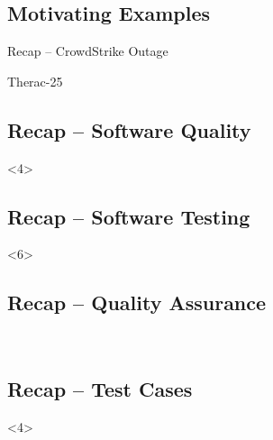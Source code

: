 \subsection{Motivating Examples}
\begin{frame}{Recap -- CrowdStrike Outage}
	\slideCrowdStrike
\end{frame}

\begin{frame}{Therac-25}
	\slideTherac
\end{frame}

\subsection{Recap -- Software Quality}
\begin{frame}<4>{\insertsubsection}
	\slideSoftwareQuality
\end{frame}

\subsection{Recap -- Software Testing}
\begin{frame}<6>{\insertsubsection}
	\slideSoftwareTesting
\end{frame}

\subsection{Recap -- Quality Assurance}
\begin{frame}{\insertsubsection\ \mytitlesource{\ludewiglichter}}
	\slideMindmapQualityAssuranceMod{}{}{}{}{}{}{}
\end{frame}

\subsection{Recap -- Test Cases}
\begin{frame}<4>{\insertsubsection}
	\begin{fancycolumns}[animation=none]
		\explTestCases
		\nextcolumn
		\figTestDesign
	\end{fancycolumns}
	
\end{frame}

